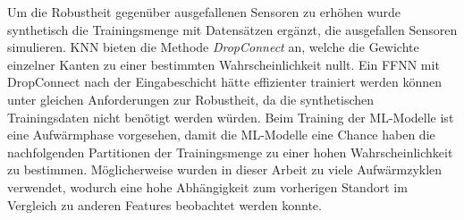 Um die Robustheit gegenüber ausgefallenen Sensoren zu erhöhen wurde synthetisch die Trainingsmenge mit Datensätzen ergänzt, die ausgefallen Sensoren simulieren.
KNN bieten die Methode \textit{DropConnect} an, welche die Gewichte einzelner Kanten zu einer bestimmten Wahrscheinlichkeit nullt.
Ein FFNN mit DropConnect nach der Eingabeschicht hätte effizienter trainiert werden können unter gleichen Anforderungen zur Robustheit,
da die synthetischen Trainingsdaten nicht benötigt werden würden.
\newline
\newline
Beim Training der ML-Modelle ist eine Aufwärmphase vorgesehen, damit die ML-Modelle eine Chance haben die nachfolgenden Partitionen der Trainingsmenge
zu einer hohen Wahrscheinlichkeit zu bestimmen.
Möglicherweise wurden in dieser Arbeit zu viele Aufwärmzyklen verwendet, wodurch eine hohe Abhängigkeit zum vorherigen Standort im Vergleich zu anderen Features beobachtet werden konnte.

